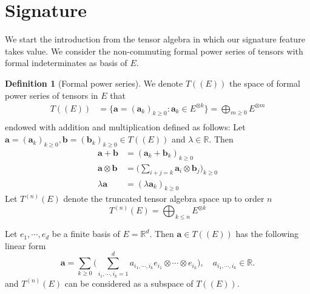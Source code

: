 \documentclass[12pt]{report}
\theoremstyle{definition}
\newtheorem{definition}[theorem]{Definition}
\theoremstyle{remark}
\newcommand{\R}{\mathbb{R}}
\begin{document}
\section{Signature}
We start the introduction from the tensor algebra in which our signature feature takes value. We consider the non-commuting formal power series of tensors with formal indeterminates as basis of $E$. 
\begin{definition}[Formal power series]
  We denote $T((E))$ the space of formal power series of tensors in $E$ that 
  \begin{equation}
    \begin{split}
      T((E)) &= \Bigg\{\mathbf{a} = (\mathbf{a}_{k})_{k\geq 0} \colon \mathbf{a}_{k} \in E^{\otimes k}\Bigg\} = \bigoplus_{m\geq 0} E^{\otimes m} \\
    \end{split}
  \end{equation}
  endowed with addition and multiplication defined as follows: Let $\mathbf{a} = (\mathbf{a}_{k})_{k\geq 0}, \mathbf{b} = (\mathbf{b}_{k})_{k\geq 0} \in T((E))$ and $\lambda \in \R$. Then 
\begin{equation}
  \begin{split}
    \mathbf{a} + \mathbf{b} &= (\mathbf{a}_{k} + \mathbf{b}_{k})_{k\geq 0}\\
    \mathbf{a} \otimes \mathbf{b} &= \big(\sum_{i+j = k}\mathbf{a}_{i} \otimes \mathbf{b}_{j}\big)_{k\geq 0}\\
    \lambda\mathbf{a} &= (\lambda \mathbf{a}_{k})_{k\geq 0}
  \end{split}
\end{equation}
Let $T^{(n)}(E)$ denote the truncated tensor algebra space up to order $n$
\begin{equation}
  T^{(n)}(E) = \bigoplus_{k\leq n} E^{\otimes k}
\end{equation}  
\end{definition}
Let $e_{1},\cdots,e_{d}$ be a finite basis of $E = \R^{d}$. Then $\mathbf{a}\in T((E))$ has the following linear form
\begin{equation} 
  \mathbf{a} = \sum_{k\geq 0}\Big(\sum_{i_{1},\cdots,i_{k} = 1}^{d} a_{i_{1},\cdots,i_{k}}e_{i_{1}}\otimes\cdots\otimes e_{i_{k}} \Big),\quad a_{i_{1},\cdots,i_{k}} \in \R.
\end{equation}
and $T^{(n)}(E)$ can be considered as a subspace of $T((E))$.
\end{document}
